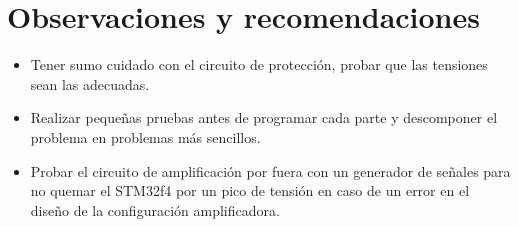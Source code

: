 \documentclass[letterpaper]{article}
\begin{document}
\section{Observaciones y recomendaciones}

\begin{itemize}
\item Tener sumo cuidado con el circuito de protección, probar que las tensiones sean las adecuadas.
\item Realizar pequeñas pruebas antes de programar cada parte y descomponer el problema en problemas más sencillos.
\item Probar el circuito de amplificación por fuera con un generador de señales para no quemar el STM32f4 por un pico de tensión en caso de un error en el diseño de la configuración amplificadora.
\end{itemize}

 

\end{document}
